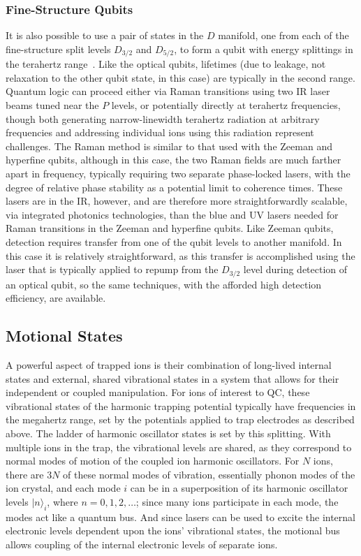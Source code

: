 \documentclass[%
reprint,
 amsmath,amssymb,
]{revtex4-1}
\begin{document}
\subsubsection{Fine-Structure Qubits}
\label{subsubFine-Structure}

It is also possible to use a pair of states in the $D$ manifold, one from each of the fine-structure split levels $D_{3/2}$ and $D_{5/2}$, to form a qubit with energy splittings in the terahertz range~\cite{PhysRevA.81.032322}.  Like the optical qubits, lifetimes (due to leakage, not relaxation to the other qubit state, in this case) are typically in the second range.  Quantum logic can proceed either via Raman transitions using two IR laser beams tuned near the $P$ levels, or potentially directly at terahertz frequencies, though both generating narrow-linewidth terahertz radiation at arbitrary frequencies and addressing individual ions using this radiation represent challenges. The Raman method is similar to that used with the Zeeman and hyperfine qubits, although in this case, the two Raman fields are much farther apart in frequency, typically requiring two separate phase-locked lasers, with the degree of relative phase stability as a potential limit to coherence times.  These lasers are in the IR, however, and are therefore more straightforwardly scalable, via integrated photonics technologies, than the blue and UV lasers needed for Raman transitions in the Zeeman and hyperfine qubits.  Like Zeeman qubits, detection requires transfer from one of the qubit levels to another manifold.  In this case it is relatively straightforward, as this transfer is accomplished using the laser that is typically applied to repump from the $D_{3/2}$ level during detection of an optical qubit, so the same techniques, with the afforded high detection efficiency, are available.

\subsection{Motional States}

A powerful aspect of trapped ions is their combination of long-lived internal states and external, shared vibrational states in a system that allows for their independent or coupled manipulation.  For ions of interest to QC, these vibrational states of the harmonic trapping potential typically have frequencies in the megahertz range, set by the potentials applied to trap electrodes as described above.  The ladder of harmonic oscillator states is set by this splitting.  With multiple ions in the trap, the vibrational levels are shared, as they correspond to normal modes of motion of the coupled ion harmonic oscillators.  For $N$ ions, there are $3N$ of these normal modes of vibration, essentially phonon modes of the ion crystal, and each mode $i$ can be in a superposition of its harmonic oscillator levels $|n\rangle_{i}$, where $n=0, 1, 2, \ldots$; since many ions participate in each mode, the modes act like a quantum bus.  And since lasers can be used to excite the internal electronic levels dependent upon the ions' vibrational states, the motional bus allows coupling of the internal electronic levels of separate ions.
\end{document}
